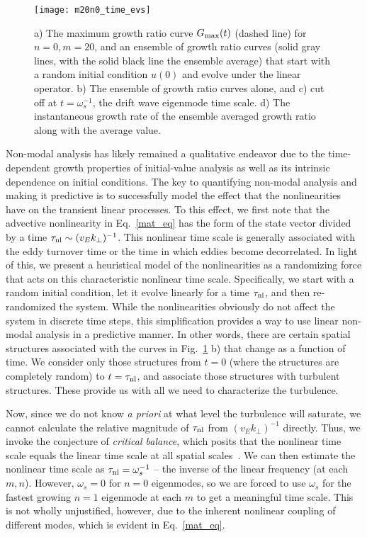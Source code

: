 \documentclass[letter,scriptaddress,twocolumn, prl,showkeys]{revtex4}
\begin{document}
\begin{figure}
\centerline{\texttt{[image: m20n0\_time\_evs]}}
\caption{a) The maximum growth ratio curve $G_{\rm{max}}(t)$ (dashed line) for $n=0,m=20$, and an ensemble of growth ratio curves (solid gray lines, with the solid black line the ensemble average)
that start with a random initial condition $u(0)$ and evolve under the linear operator. b) The ensemble of growth ratio curves alone, and c) cut off at $t=\omega_s^{-1}$, the drift wave eigenmode
time scale. d) The instantaneous growth rate of the ensemble averaged growth ratio along with the average value.}
\label{m20n0_time_evs}
\end{figure}

Non-modal analysis has likely remained a qualitative endeavor due to the time-dependent growth properties of initial-value analysis as well as its intrinsic dependence on initial conditions.
The key to quantifying non-modal analysis and making it predictive is to successfully model the effect that the nonlinearities have on the transient linear processes. 
To this effect, we first note that the advective nonlinearity in Eq.~\ref{mat_eq} has the form of the state vector divided by a time $\tau_{\rm{nl}} \sim (v_E k_\perp)^{-1}$. This nonlinear
time scale is generally associated with the eddy turnover time or the time in which eddies become decorrelated. In light of this, we present a heuristical model of the nonlinearities 
as a randomizing force that acts on this characteristic nonlinear time scale.
Specifically, we start with a random initial condition, let it evolve linearly for a time $\tau_{\rm{nl}}$, and then re-randomized the system.
While the nonlinearities obviously do not affect the system in discrete time steps, this simplification provides a way to use linear non-modal analysis in a predictive manner.
In other words, there are certain spatial structures associated with the curves in Fig.~\ref{m20n0_time_evs} b) that change as a function of time. We consider only those structures from $t=0$ (where
the structures are completely random) to $t = \tau_{\rm{nl}}$, and associate those structures with turbulent structures. These provide us with all we need to characterize the turbulence.

Now, since we do not know \emph{a priori} at what level the turbulence will saturate, we cannot calculate the relative magnitude of $\tau_{\rm{nl}}$ from $(v_E k_\perp)^{-1}$ directly.
Thus, we invoke the conjecture of \emph{critical balance}, which posits that the nonlinear time scale equals the linear time scale at all spatial scales~\cite{schekochihin2012}. 
We can then estimate the nonlinear time scale as $\tau_{\rm{nl}} = \omega_s^{-1}$ -- the inverse of the linear frequency (at each $m,n$).
However, $\omega_s = 0$ for $n=0$ eigenmodes, so we are forced to use $\omega_s$ for the fastest growing $n=1$ eigenmode at each $m$ to get a meaningful time scale. This is not wholly
unjustified, however, due to the inherent nonlinear coupling of different modes, which is evident in Eq.~\ref{mat_eq}.
\end{document}
